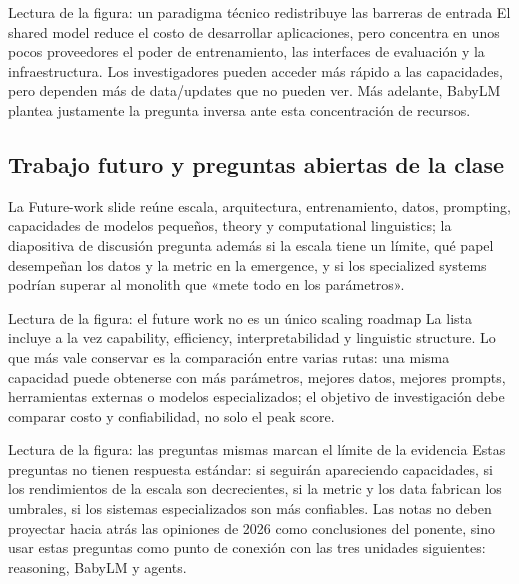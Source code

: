 
\begin{knowledgebox}{Lectura de la figura: un paradigma técnico redistribuye las barreras de entrada}
El shared model reduce el costo de desarrollar aplicaciones, pero concentra en unos pocos proveedores el poder de entrenamiento, las interfaces de evaluación y la infraestructura. Los investigadores pueden acceder más rápido a las capacidades, pero dependen más de data/updates que no pueden ver. Más adelante, BabyLM plantea justamente la pregunta inversa ante esta concentración de recursos.
\end{knowledgebox}

\subsection{Trabajo futuro y preguntas abiertas de la clase}

La Future-work slide reúne escala, arquitectura, entrenamiento, datos, prompting, capacidades de modelos pequeños, theory y computational linguistics; la diapositiva de discusión pregunta además si la escala tiene un límite, qué papel desempeñan los datos y la metric en la emergence, y si los specialized systems podrían superar al monolith que «mete todo en los parámetros».


\begin{knowledgebox}{Lectura de la figura: el future work no es un único scaling roadmap}
La lista incluye a la vez capability, efficiency, interpretabilidad y linguistic structure. Lo que más vale conservar es la comparación entre varias rutas: una misma capacidad puede obtenerse con más parámetros, mejores datos, mejores prompts, herramientas externas o modelos especializados; el objetivo de investigación debe comparar costo y confiabilidad, no solo el peak score.
\end{knowledgebox}


\begin{knowledgebox}{Lectura de la figura: las preguntas mismas marcan el límite de la evidencia}
Estas preguntas no tienen respuesta estándar: si seguirán apareciendo capacidades, si los rendimientos de la escala son decrecientes, si la metric y los data fabrican los umbrales, si los sistemas especializados son más confiables. Las notas no deben proyectar hacia atrás las opiniones de 2026 como conclusiones del ponente, sino usar estas preguntas como punto de conexión con las tres unidades siguientes: reasoning, BabyLM y agents.
\end{knowledgebox}

